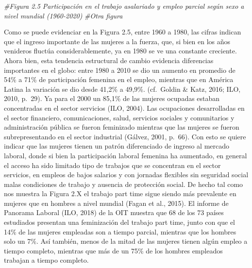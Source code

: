\documentclass[
]{book}
\newenvironment{Shaded}{\begin{snugshade}}{\end{snugshade}}
\newcommand{\CommentTok}[1]{\textcolor[rgb]{0.56,0.35,0.01}{\textit{#1}}}
\begin{document}
\begin{Shaded}
\begin{Highlighting}[]
\CommentTok{#Figura 2.5 Participación en el trabajo asalariado y empleo parcial según sexo a nivel mundial (1960-2020)}
\CommentTok{#Otra figura }
\end{Highlighting}
\end{Shaded}

Como se puede evidenciar en la Figura 2.5, entre 1960 a 1980, las cifras indican que el ingreso importante de las mujeres a la fuerza, que, si bien en los años venideros fluctúa considerablemente, ya en 1980 se ve una constante creciente. Ahora bien, esta tendencia estructural de cambio evidencia diferencias importantes en el globo: entre 1980 a 2010 se dio un aumento en promedio de 54\% a 71\% de participación femenina en el empleo, mientras que en América Latina la variación se dio desde 41,2\% a 49,9\%. (cf.~Goldin \& Katz, 2016; ILO, 2010, p.~29). Ya para el 2000 un 85,1\% de las mujeres ocupadas estaban concentradas en el sector servicios (ILO, 2004). Las ocupaciones desarrolladas en el sector financiero, comunicaciones, salud, servicios sociales y comunitarios y administración pública se fueron feminizado mientras que las mujeres se fueron subrepresentando en el sector industrial (Gálvez, 2001, p.~66). Con esto se quiere indicar que las mujeres tienen un patrón diferenciado de ingreso al mercado laboral, donde si bien la participación laboral femenina ha aumentado, en general el acceso ha sido limitado tipo de trabajos que se concentran en el sector servicios, en empleos de bajos salarios y con jornadas flexibles sin seguridad social malas condiciones de trabajo y ausencia de protección social. De hecho tal como nos muestra la Figura 2.X el trabajo part time sigue siendo más prevalente en mujeres que en hombres a nivel mundial (Fagan et al., 2015). El informe de Panorama Laboral (ILO, 2018) de la OIT muestra que 68 de los 73 países estudiados presentan una feminización del trabajo part time, junto con que el 14\% de las mujeres empleadas son a tiempo parcial, mientras que los hombres solo un 7\%. Así también, menos de la mitad de las mujeres tienen algún empleo a tiempo completo, mientras que más de un 75\% de los hombres empleados trabajan a tiempo completo.
\end{document}
